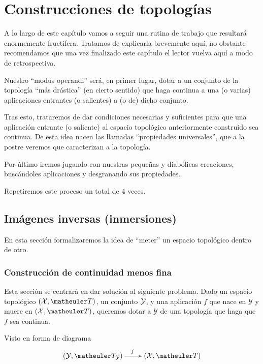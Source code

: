 \chapter{Construcciones de topologías}
\label{const}
A lo largo de este capítulo vamos a seguir una rutina de trabajo que resultará enormemente fructífera. Tratamos de explicarla brevemente aquí, no obstante recomendamos que una vez finalizado este capítulo el lector vuelva aquí a modo de retrospectiva.

Nuestro ``modus operandi'' será, en primer lugar, dotar a un conjunto de la topología ``más drástica'' (en cierto sentido) que haga continua a una (o varias) aplicaciones entrantes (o salientes) a (o de) dicho conjunto.

Tras esto, trataremos de dar condiciones necesarias y suficientes para que una aplicación entrante (o saliente) al espacio topológico anteriormente construido sea continua. De esta idea nacen las llamadas ``propiedades universales'', que a la postre veremos que caracterizan a la topología.

Por último iremos jugando con nuestras pequeñas y diabólicas creaciones, buscándoles aplicaciones y desgranando sus propiedades.

Repetiremos este proceso un total de $4$ veces. 
\section{Imágenes inversas (inmersiones)}
En esta sección formalizaremos la idea de ``meter'' un espacio topológico dentro de otro.
\subsection{Construcción de continuidad menos fina}
Esta sección se centrará en dar solución al siguiente problema. Dado un espacio topológico $(\mathcal{X},\T)$, un conjunto $\mathcal{Y}$, y una aplicación $f$ que nace en $\mathcal{Y}$ y muere en $(\mathcal{X},\T)$, queremos dotar a $\mathcal{Y}$ de una topología que haga que $f$ sea continua.

Visto en forma de diagrama
\begin{equation*}
\xymatrix{
	(\mc{Y},\T_\Y) \ar[r]^f
	&(\mathcal{X},\T)}
\end{equation*}

